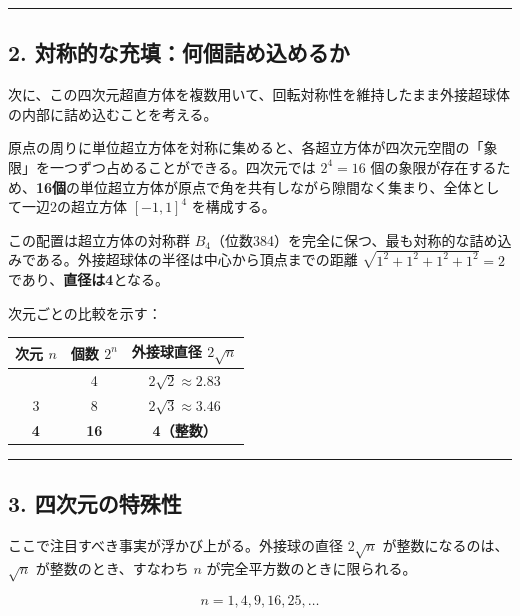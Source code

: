 \documentclass[a4paper,11pt]{ltjsarticle}
\theoremstyle{definition}
\begin{document}
\begin{center}\rule{0.5\linewidth}{0.5pt}\end{center}

\subsection{2.
対称的な充填：何個詰め込めるか}\label{ux5bfeux79f0ux7684ux306aux5145ux586bux4f55ux500bux8a70ux3081ux8fbcux3081ux308bux304b}

次に、この四次元超直方体を複数用いて、回転対称性を維持したまま外接超球体の内部に詰め込むことを考える。

原点の周りに単位超立方体を対称に集めると、各超立方体が四次元空間の「象限」を一つずつ占めることができる。四次元では
\(2^4 = 16\)
個の象限が存在するため、\textbf{16個}の単位超立方体が原点で角を共有しながら隙間なく集まり、全体として一辺2の超立方体
\([-1,1]^4\) を構成する。

この配置は超立方体の対称群
\(B_4\)（位数384）を完全に保つ、最も対称的な詰め込みである。外接超球体の半径は中心から頂点までの距離
\(\sqrt{1^2+1^2+1^2+1^2} = 2\) であり、\textbf{直径は4}となる。

次元ごとの比較を示す：

{\def\LTcaptype{none} %
\begin{longtable}[]{@{}ccc@{}}
\toprule\noalign{}
次元 \(n\) & 個数 \(2^n\) & 外接球直径 \(2\sqrt{n}\) \\
\midrule\noalign{}
\endhead
\bottomrule\noalign{}
\endlastfoot
2 & 4 & \(2\sqrt{2} \approx 2.83\) \\
3 & 8 & \(2\sqrt{3} \approx 3.46\) \\
\textbf{4} & \textbf{16} & \textbf{4（整数）} \\
\end{longtable}
}

\begin{center}\rule{0.5\linewidth}{0.5pt}\end{center}

\subsection{3.
四次元の特殊性}\label{ux56dbux6b21ux5143ux306eux7279ux6b8aux6027}

ここで注目すべき事実が浮かび上がる。外接球の直径 \(2\sqrt{n}\)
が整数になるのは、\(\sqrt{n}\) が整数のとき、すなわち \(n\)
が完全平方数のときに限られる。

\[n = 1, 4, 9, 16, 25, \ldots\]
\end{document}
